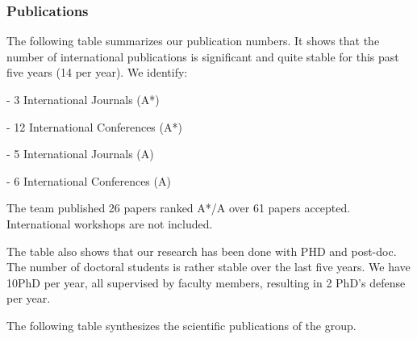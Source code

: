\subsubsection{Publications} %

The following table summarizes our publication numbers. It  shows that the number of international publications is significant and quite stable for this past five years (14 per year). We identify: 

- 3 International Journals (A*)

- 12  International Conferences (A*)

- 5 International Journals (A) 

- 6 International Conferences (A)

The team published  26 papers ranked A*/A over 61 papers accepted. International workshops are not included.

The table also shows that our research has been done with PHD and post-doc. The  number of doctoral students is rather stable over the last five years. We have 10PhD per year, all supervised by faculty members, resulting in 2 PhD's defense per year. 



The following table synthesizes the scientific publications of the group.

